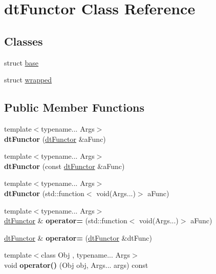 \hypertarget{classdt_functor}{}\section{dt\+Functor Class Reference}
\label{classdt_functor}
\subsection*{Classes}
\begin{DoxyCompactItemize}
\item 
struct \hyperlink{structdt_functor_1_1base}{base}
\item 
struct \hyperlink{structdt_functor_1_1wrapped}{wrapped}
\end{DoxyCompactItemize}
\subsection*{Public Member Functions}
\begin{DoxyCompactItemize}
\item 
\mbox{\label{classdt_functor_a507910c3dcc0414497a17f6204d88671}} 
{\footnotesize template$<$typename... Args$>$ }\\{\bfseries dt\+Functor} (\hyperlink{classdt_functor}{dt\+Functor} \&a\+Func)
\item 
\mbox{\label{classdt_functor_aacc40d2fed913a086e8649a5fe3bb24e}} 
{\footnotesize template$<$typename... Args$>$ }\\{\bfseries dt\+Functor} (const \hyperlink{classdt_functor}{dt\+Functor} \&a\+Func)
\item 
\mbox{\label{classdt_functor_ab931dbe2c475bdfad4aee5df1d7d2f96}} 
{\footnotesize template$<$typename... Args$>$ }\\{\bfseries dt\+Functor} (std\+::function$<$ void(Args...)$>$ a\+Func)
\item 
\mbox{\label{classdt_functor_a30c1a42395945cf200ac584a19e421d8}} 
{\footnotesize template$<$typename... Args$>$ }\\\hyperlink{classdt_functor}{dt\+Functor} \& {\bfseries operator=} (std\+::function$<$ void(Args...)$>$ a\+Func)
\item 
\mbox{\label{classdt_functor_ac8980a0e998d84ae700b0b56464cbf1c}} 
\hyperlink{classdt_functor}{dt\+Functor} \& {\bfseries operator=} (\hyperlink{classdt_functor}{dt\+Functor} \&dt\+Func)
\item 
\mbox{\label{classdt_functor_a184225633c35c4be88afafca6661949b}} 
{\footnotesize template$<$class Obj , typename... Args$>$ }\\void {\bfseries operator()} (Obj obj, Args... args) const
\end{DoxyCompactItemize}

